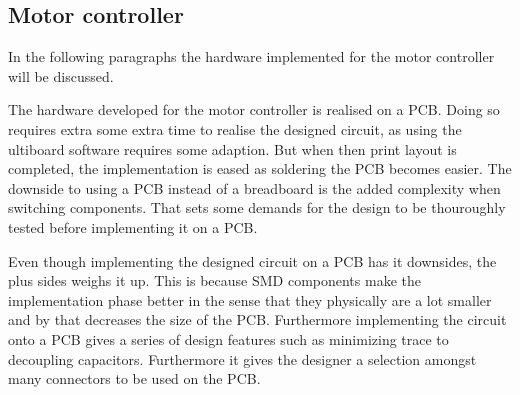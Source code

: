 \subsection*{Motor controller}
In the following paragraphs the hardware implemented for the motor controller will be discussed. 

The hardware developed for the motor controller is realised on a PCB. Doing so requires extra some extra time to realise the designed circuit, as using the ultiboard software requires some adaption. But when then print layout is completed, the implementation is eased as soldering the PCB becomes easier. The downside to using a PCB instead of a breadboard is the added complexity when switching components. That sets some demands for the design to be thouroughly tested before implementing it on a PCB.

Even though implementing the designed circuit on a PCB has it downsides, the plus sides weighs it up. This is because SMD components make the implementation phase better in the sense that they physically are a lot smaller and by that decreases the size of the PCB. Furthermore implementing the circuit onto a PCB gives a series of design features such as minimizing trace to decoupling capacitors. Furthermore it gives the designer a selection amongst many connectors to be used on the PCB. 

 